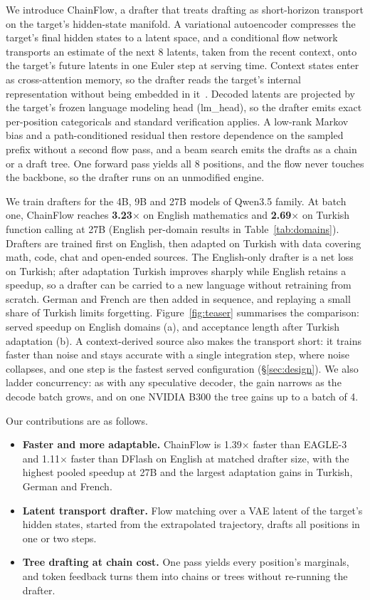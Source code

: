 \documentclass{article}
\newcommand{\Sys}{ChainFlow\xspace}
\newcommand{\TargetFamily}{Qwen3.5\xspace}          %
\newcommand{\TargetSizes}{4B, 9B and 27B}
\newcommand{\SpeedupEnMath}{3.23$\times$}      %
\newcommand{\SpeedupTrFC}{2.69$\times$}        %
\newcommand{\ConcurrencyLimit}{4}              %
\newcommand{\Kdraft}{8}                        %
\begin{document}
We introduce \Sys, a drafter that treats drafting as short-horizon transport on the target's hidden-state manifold. A variational autoencoder compresses the target's final hidden states to a latent space, and a conditional flow network transports an estimate of the next $\Kdraft$ latents, taken from the recent context, onto the target's future latents in one Euler step at serving time. Context states enter as cross-attention memory, so the drafter reads the target's internal representation without being embedded in it~\citep{samragh2025future}. Decoded latents are projected by the target's frozen language modeling head (lm\_head), so the drafter emits exact per-position categoricals and standard verification applies. A low-rank Markov bias and a path-conditioned residual then restore dependence on the sampled prefix without a second flow pass, and a beam search emits the drafts as a chain or a draft tree. One forward pass yields all $\Kdraft$ positions, and the flow never touches the backbone, so the drafter runs on an unmodified engine.

We train drafters for the \TargetSizes{} models of \TargetFamily family. At batch one, \Sys reaches \textbf{\SpeedupEnMath{}} on English mathematics and \textbf{\SpeedupTrFC{}} on Turkish function calling at 27B (English per-domain results in Table~\ref{tab:domains}). Drafters are trained first on English, then adapted on Turkish with data covering math, code, chat and open-ended sources. The English-only drafter is a net loss on Turkish; after adaptation Turkish improves sharply while English retains a speedup, so a drafter can be carried to a new language without retraining from scratch. German and French are then added in sequence, and replaying a small share of Turkish limits forgetting. Figure~\ref{fig:teaser} summarises the comparison: served speedup on English domains (a), and acceptance length after Turkish adaptation (b). A context-derived source also makes the transport short: it trains faster than noise and stays accurate with a single integration step, where noise collapses, and one step is the fastest served configuration (\S\ref{sec:design}). We also ladder concurrency: as with any speculative decoder, the gain narrows as the decode batch grows, and on one NVIDIA B300 the tree gains up to a batch of \ConcurrencyLimit{}.


Our contributions are as follows.
\begin{itemize}
\item \textbf{Faster and more adaptable.} ChainFlow is 1.39$\times$ faster than
EAGLE-3 and 1.11$\times$ faster than DFlash on English at matched drafter
size, with the highest pooled speedup at 27B and the largest adaptation gains in
Turkish, German and French.
\item \textbf{Latent transport drafter.} Flow matching over a VAE latent
of the target's hidden states, started from the extrapolated trajectory,
drafts all positions in one or two steps.
\item \textbf{Tree drafting at chain cost.} One pass yields every
position's marginals, and token feedback turns them into chains or trees
without re-running the drafter.
\end{itemize}
\end{document}

